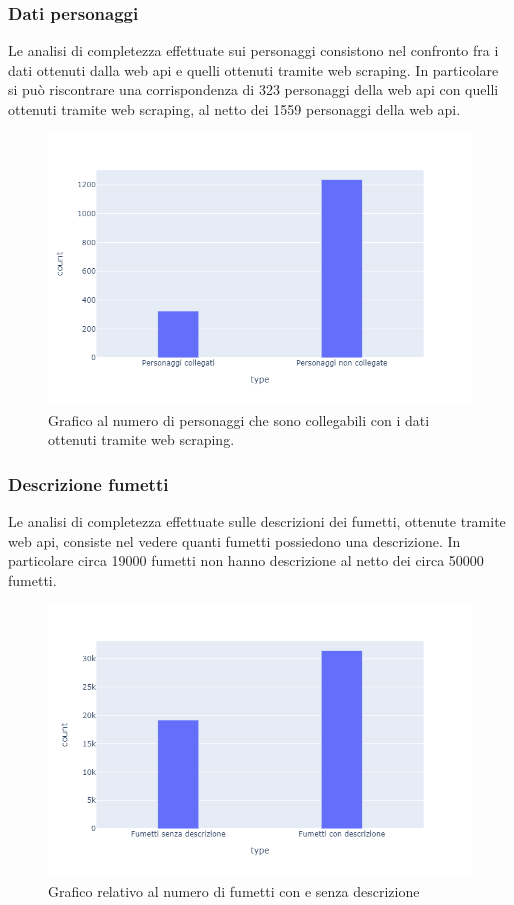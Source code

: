 \documentclass[
10pt, %
a4paper, %
oneside, %
headinclude,footinclude, %
BCOR5mm, %
]{scrartcl}
\begin{document}
\subsubsection{Dati personaggi}
Le analisi di completezza effettuate sui personaggi consistono nel confronto fra i dati ottenuti dalla web api e quelli ottenuti tramite web scraping. In particolare si può riscontrare una corrispondenza di 323 personaggi della web api con quelli ottenuti tramite web scraping, al netto dei 1559 personaggi della web api.
\begin{figure}[H]
  \includegraphics[scale=0.5]{plot_corrispondenza_personaggi.png}
  \caption{Grafico al numero di personaggi che sono collegabili con i dati ottenuti tramite web scraping.}
\end{figure}
\subsubsection{Descrizione fumetti}
Le analisi di completezza effettuate sulle descrizioni dei fumetti, ottenute tramite web api, consiste nel vedere quanti fumetti possiedono una descrizione. In particolare circa 19000 fumetti non hanno descrizione al netto dei circa 50000 fumetti.
\begin{figure}[H]
  \includegraphics[scale=0.5]{plot_descrizione_fumetti.png}
  \caption{Grafico relativo al numero di fumetti con e senza descrizione}
\end{figure}
\end{document}
